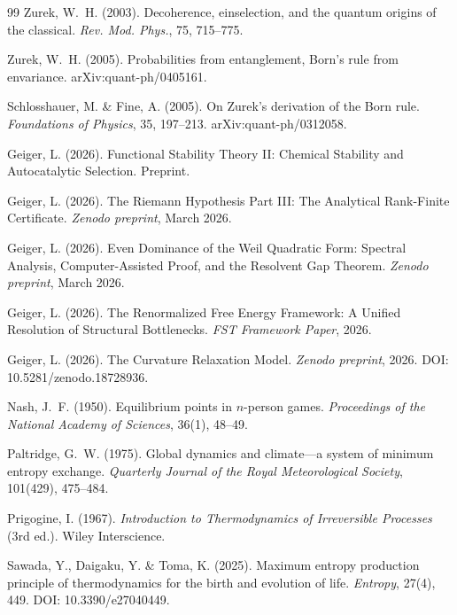 \documentclass[12pt,a4paper]{article}
\theoremstyle{remark}
\begin{document}
\begin{thebibliography}{99}
Zurek, W.~H. (2003).
\newblock Decoherence, einselection, and the quantum origins of the classical.
\newblock \textit{Rev. Mod. Phys.}, 75, 715--775.

Zurek, W.~H. (2005).
\newblock Probabilities from entanglement, Born's rule from envariance.
\newblock arXiv:quant-ph/0405161.

Schlosshauer, M. \& Fine, A. (2005).
\newblock On Zurek's derivation of the Born rule.
\newblock \textit{Foundations of Physics}, 35, 197--213. arXiv:quant-ph/0312058.

Geiger, L. (2026).
\newblock Functional Stability Theory II: Chemical Stability and Autocatalytic Selection.
\newblock Preprint.

Geiger, L. (2026).
\newblock The Riemann Hypothesis Part III: The Analytical Rank-Finite Certificate.
\newblock \textit{Zenodo preprint}, March 2026.

Geiger, L. (2026).
\newblock Even Dominance of the Weil Quadratic Form: Spectral Analysis, Computer-Assisted Proof, and the Resolvent Gap Theorem.
\newblock \textit{Zenodo preprint}, March 2026.

Geiger, L. (2026).
\newblock The Renormalized Free Energy Framework: A Unified Resolution of Structural Bottlenecks.
\newblock \textit{FST Framework Paper}, 2026.

Geiger, L. (2026).
\newblock The Curvature Relaxation Model.
\newblock \textit{Zenodo preprint}, 2026.
\newblock DOI: 10.5281/zenodo.18728936.

Nash, J.~F. (1950).
\newblock Equilibrium points in $n$-person games.
\newblock \textit{Proceedings of the National Academy of Sciences}, 36(1), 48--49.

Paltridge, G.~W. (1975).
\newblock Global dynamics and climate---a system of minimum entropy exchange.
\newblock \textit{Quarterly Journal of the Royal Meteorological Society}, 101(429), 475--484.

Prigogine, I. (1967).
\newblock \textit{Introduction to Thermodynamics of Irreversible Processes} (3rd ed.).
\newblock Wiley Interscience.

Sawada, Y., Daigaku, Y. \& Toma, K. (2025).
\newblock Maximum entropy production principle of thermodynamics for the birth and evolution of life.
\newblock \textit{Entropy}, 27(4), 449.
\newblock DOI: 10.3390/e27040449.

\end{thebibliography}
\end{document}
